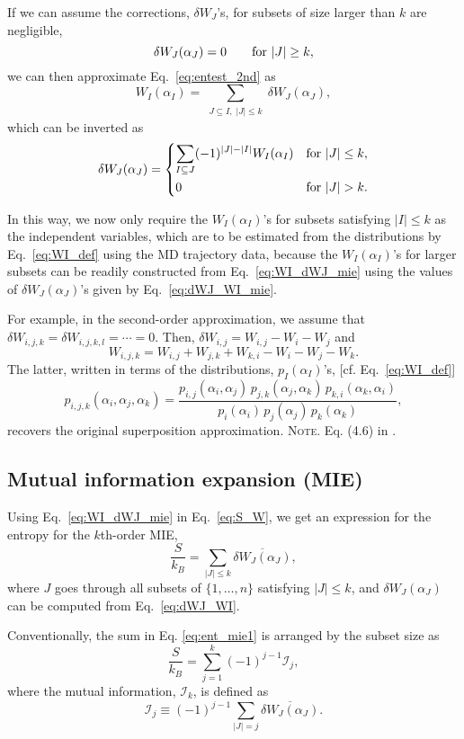 \documentclass[preprint, superscriptaddress]{revtex4-1}
\newcommand{\note}[1]{{\color{DarkGreen}\footnotesize \textsc{Note.} #1}}
\newcommand{\MI}{\mathcal I} %
\begin{document}
If we can assume the corrections, $\delta W_J$'s,
for subsets of size larger than $k$ are negligible,
%
\begin{equation}
  \delta W_J(\alpha_J) = 0
  \qquad
  \mbox{for $|J| \ge k$}
  ,
  \notag
\end{equation}
%
we can then approximate Eq.~\eqref{eq:entest_2nd} as
%
\begin{equation}
  W_I(\alpha_I)
  =
  \sum_{ \substack{J \subseteq I, \; |J| \le k} }
  \!\! \delta W_J(\alpha_J)
  ,
  \label{eq:WI_dWJ_mie}
\end{equation}
%
which can be inverted as
%
\begin{equation}
  \delta W_J(\alpha_J)
  =
  \begin{dcases}
    \sum_{ I \subseteq J }
    (-1)^{|J| - |I|} W_I(\alpha_I)
    &\mbox{for $|J| \le k$}
    ,
    \\
    0
    &\mbox{for $|J| > k$}
    .
  \end{dcases}
  \label{eq:dWJ_WI_mie}
\end{equation}
%

In this way, we now only require the $W_I(\alpha_I)$'s
for subsets satisfying $|I| \le k$
as the independent variables,
which are to be estimated from the distributions
by Eq.~\eqref{eq:WI_def} using the MD trajectory data,
because the $W_I(\alpha_I)$'s for larger subsets
can be readily constructed from Eq.~\eqref{eq:WI_dWJ_mie}
using the values of $\delta W_J(\alpha_J)$'s
given by Eq.~\eqref{eq:dWJ_WI_mie}.

For example,
in the second-order approximation,
we assume that
$\delta W_{i, j, k} = \delta W_{i,j,k, l} = \cdots = 0$.
%
Then,
$\delta W_{i, j} = W_{i,j} - W_i - W_j$
and
$$
W_{i, j, k} = W_{i,j} + W_{j,k} + W_{k,i} - W_i - W_j - W_k.
$$
The latter, written in terms of the distributions, $p_I(\alpha_I)$'s,
[cf. Eq.~\eqref{eq:WI_def}]
%
$$
p_{i,j,k}(\alpha_i, \alpha_j, \alpha_k)
=
\frac{ p_{i,j}(\alpha_i, \alpha_j) \, p_{j,k}(\alpha_j, \alpha_k) \, p_{k,i}(\alpha_k, \alpha_i) }{ p_i(\alpha_i) \, p_j(\alpha_j) \, p_k(\alpha_k) }
,
$$
recovers the original superposition approximation\cite{kirkwood1935, born1946}.
\note{Eq. (4.6) in \cite{born1946}.}

\subsection{Mutual information expansion (MIE)}


Using Eq.~\eqref{eq:WI_dWJ_mie} in Eq.~\eqref{eq:S_W},
we get an expression for the entropy for the $k$th-order MIE,
\begin{equation}
  \frac{S}{k_B}
  =
  \sum_{|J| \le k} \overline{ \delta W_J(\alpha_J) },
  \label{eq:ent_mie1}
\end{equation}
where $J$ goes through all subsets of $\{1, \dots, n\}$ satisfying $|J| \le k$,
and $\delta W_J(\alpha_J)$ can be computed from Eq.~\eqref{eq:dWJ_WI}.

Conventionally, the sum in Eq. \eqref{eq:ent_mie1}
is arranged by the subset size as
$$
\frac{S}{k_B}
=
\sum_{j = 1}^k (-1)^{j-1} \MI_j,
$$
%
where the mutual information, $\MI_k$, is defined as
$$
\MI_j \equiv (-1)^{j-1} \sum_{|J| = j} \overline{ \delta W_J(\alpha_J) }.
$$


\end{document}
